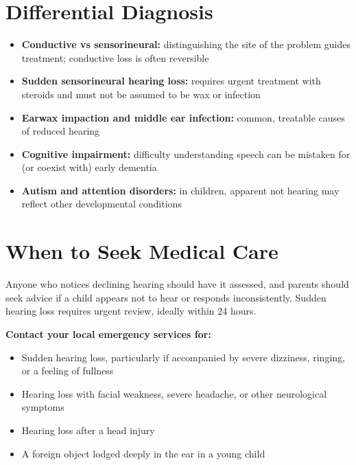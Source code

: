 \section*{Differential Diagnosis}
\begin{itemize}
    \item \textbf{Conductive vs sensorineural:} distinguishing the site of the problem guides treatment; conductive loss is often reversible
    \item \textbf{Sudden sensorineural hearing loss:} requires urgent treatment with steroids and must not be assumed to be wax or infection
    \item \textbf{Earwax impaction and middle ear infection:} common, treatable causes of reduced hearing
    \item \textbf{Cognitive impairment:} difficulty understanding speech can be mistaken for (or coexist with) early dementia
    \item \textbf{Autism and attention disorders:} in children, apparent not hearing may reflect other developmental conditions
\end{itemize}

\section*{When to Seek Medical Care}
Anyone who notices declining hearing should have it assessed, and parents should seek advice if a child appears not to hear or responds inconsistently. Sudden hearing loss requires urgent review, ideally within 24 hours.

\textbf{Contact your local emergency services for:}
\begin{itemize}
    \item Sudden hearing loss, particularly if accompanied by severe dizziness, ringing, or a feeling of fullness
    \item Hearing loss with facial weakness, severe headache, or other neurological symptoms
    \item Hearing loss after a head injury
    \item A foreign object lodged deeply in the ear in a young child
\end{itemize}

